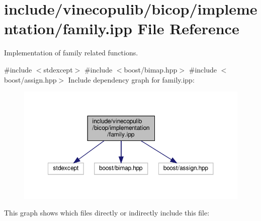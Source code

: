 \hypertarget{family_8ipp}{}\section{include/vinecopulib/bicop/implementation/family.ipp File Reference}
\label{family_8ipp}


Implementation of family related functions.  


{\ttfamily \#include $<$stdexcept$>$}\newline
{\ttfamily \#include $<$boost/bimap.\+hpp$>$}\newline
{\ttfamily \#include $<$boost/assign.\+hpp$>$}\newline
Include dependency graph for family.\+ipp\+:\nopagebreak
\begin{figure}[H]
\begin{center}
\leavevmode
\includegraphics[width=350pt]{family_8ipp__incl}
\end{center}
\end{figure}
This graph shows which files directly or indirectly include this file\+:\nopagebreak
